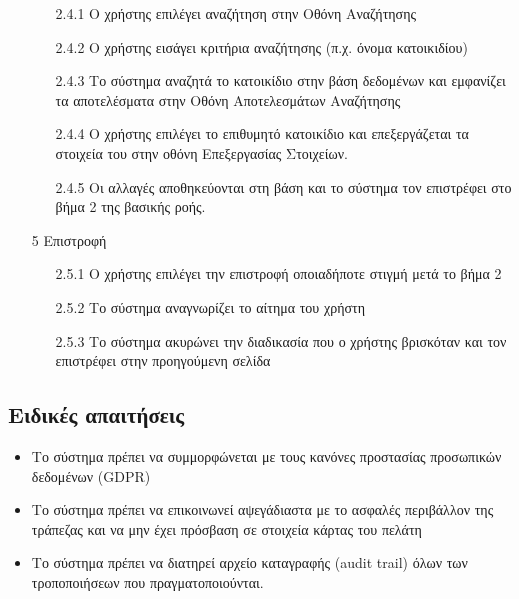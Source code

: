 \documentclass[12pt,a4paper,twoside]{book}
\begin{document}
\begin{enumerate}
        \begin{enumerate}
          \item[2.4.1 ] Ο χρήστης επιλέγει αναζήτηση στην Οθόνη Αναζήτησης %
          \item[2.4.2 ] Ο χρήστης εισάγει κριτήρια αναζήτησης (π.χ. όνομα κατοικιδίου) %
          \item[2.4.3 ] Το σύστημα αναζητά το κατοικίδιο στην βάση δεδομένων και εμφανίζει τα αποτελέσματα στην Οθόνη Αποτελεσμάτων Αναζήτησης %
          \item[2.4.4 ] Ο χρήστης επιλέγει το επιθυμητό κατοικίδιο και επεξεργάζεται τα στοιχεία του στην οθόνη Επεξεργασίας Στοιχείων. %
          \item[2.4.5 ] Οι αλλαγές αποθηκεύονται στη βάση και το σύστημα τον επιστρέφει στο βήμα 2 της βασικής ροής. %
        \end{enumerate}
  \item[5 ] Επιστροφή
        \begin{enumerate}
          \item[2.5.1 ] Ο χρήστης επιλέγει την επιστροφή οποιαδήποτε στιγμή μετά το βήμα 2 %
          \item[2.5.2 ] Το σύστημα αναγνωρίζει το αίτημα του χρήστη %
          \item[2.5.3 ] Το σύστημα ακυρώνει την διαδικασία που ο χρήστης βρισκόταν και τον επιστρέφει στην προηγούμενη σελίδα %
        \end{enumerate}
\end{enumerate}

\subsection{Ειδικές απαιτήσεις} %
\begin{itemize}
  \item Το σύστημα πρέπει να συμμορφώνεται με τους κανόνες προστασίας προσωπικών δεδομένων (GDPR)  %
  \item Το σύστημα πρέπει να επικοινωνεί αψεγάδιαστα με το ασφαλές περιβάλλον της τράπεζας και να μην έχει πρόσβαση σε στοιχεία κάρτας του πελάτη   %
  \item Το σύστημα πρέπει να διατηρεί αρχείο καταγραφής (audit trail) όλων των τροποποιήσεων που πραγματοποιούνται. %
\end{itemize}
\end{document}
